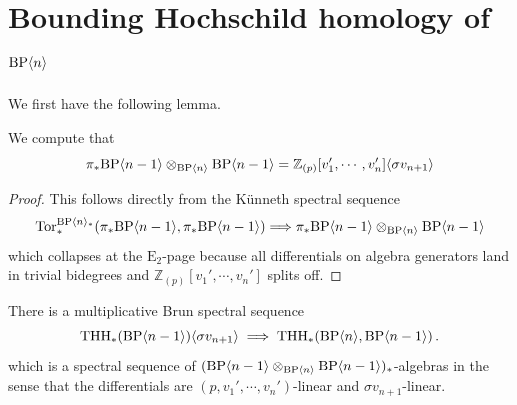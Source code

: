 \section{Bounding Hochschild homology of $\mathrm{BP}\langle n\rangle$}
We first have the following lemma. 
\begin{lemma}
We compute that 
\[\pi_*\mathrm{BP}\langle n-1\rangle\otimes_{\mathrm{BP}\langle n\rangle}\mathrm{BP}\langle n-1\rangle=\mathbb{Z}_{(p)}[v_1',\cdots ,v_n']\langle \sigma v_{n+1} \rangle \]
\end{lemma}
\begin{proof}
This follows directly from the K\"unneth spectral sequence
\[ 
\operatorname{Tor}_*^{\mathrm{BP}\langle n\rangle_*}(\pi_*\mathrm{BP}\langle n-1\rangle,\pi_*\mathrm{BP}\langle n-1\rangle)\Longrightarrow \pi_*\mathrm{BP}\langle n-1\rangle\otimes_{\mathrm{BP}\langle n\rangle}\mathrm{BP}\langle n-1\rangle
\]
which collapses at the $\mathrm{E}_2$-page because all differentials on algebra generators land in trivial bidegrees and $\mathbb{Z}_{(p)}[v_1',\cdots ,v_n']$ splits off. 
\end{proof}
\begin{proposition}
There is a multiplicative Brun spectral sequence 
\[
\operatorname{THH}_*(\mathrm{BP}\langle n-1 \rangle)\langle \sigma v_{n+1}\rangle \implies \operatorname{THH}_*(\mathrm{BP}\langle n\rangle,\mathrm{BP}\langle n-1\rangle)\,.
\]
which is a spectral sequence of $(\mathrm{BP}\langle n-1 \rangle\otimes_{\mathrm{BP}\langle n\rangle}\mathrm{BP}\langle n-1 \rangle)_*$-algebras in the sense that the differentials are $(p,v_1',\cdots ,v_n')$-linear and $\sigma v_{n+1}$-linear. 
\end{proposition}
